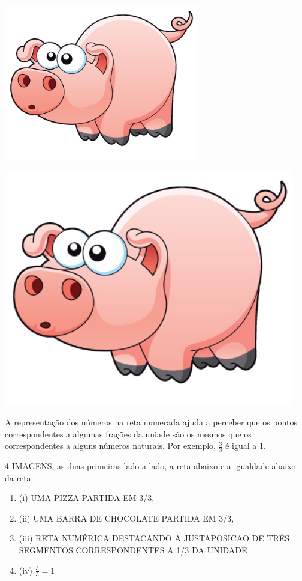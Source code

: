 \documentclass[a4,12pt]{book}
\begin{document}
\begin{imagem*}[breakable]{}{}       \includegraphics[width=240pt, keepaspectratio]{pig}    \end{imagem*}
\begin{imagem*}[breakable]{}{}       \includegraphics[width=360pt, keepaspectratio]{pig}   \end{imagem*}

A representação dos números na reta numerada ajuda a perceber que os pontos correspondentes a algumas frações da uniade são os mesmos que os correspondentes a alguns números naturais. Por exemplo, $\frac{3}{3}$ é igual a 1.

\begin{imagem*}[breakable]{}{}   4 IMAGENS, as duas primeiras lado a lado, a reta abaixo e a igualdade abaixo da reta:

\begin{enumerate} [\quad a)] %
    \item       (i) UMA PIZZA PARTIDA EM 3/3,
    \item       (ii) UMA BARRA DE CHOCOLATE PARTIDA EM 3/3,
    \item       (iii) RETA NUMÉRICA DESTACANDO A JUSTAPOSICAO DE TRÊS SEGMENTOS CORRESPONDENTES A 1/3 DA UNIDADE
    \item       (iv)       $\frac{3}{3}=1$
\end{enumerate} %

\end{imagem*}
\end{document}
